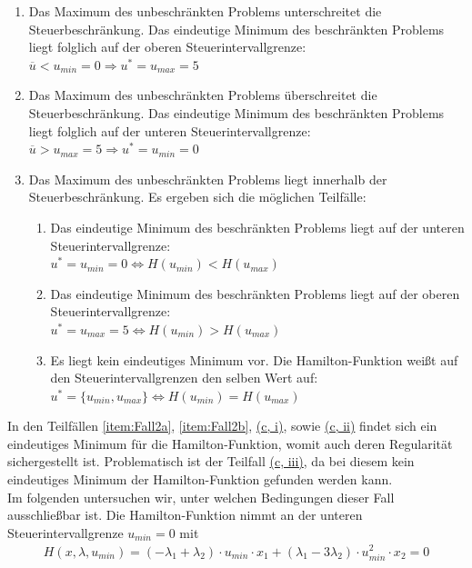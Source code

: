 \begin{enumerate}[label=(\alph*)]
	\item Das Maximum des unbeschränkten Problems unterschreitet die Steuerbeschränkung. Das eindeutige Minimum des beschränkten Problems liegt folglich auf der oberen Steuerintervallgrenze: \\ 
$\overline{u} < u_{min} = 0 \Rightarrow u^* = u_{max} = 5$ \label{item:Fall2a}
	\item Das Maximum des unbeschränkten Problems überschreitet die Steuerbeschränkung. Das eindeutige Minimum des beschränkten Problems liegt folglich auf der unteren Steuerintervallgrenze: \\ 
$\overline{u} > u_{max} = 5 \Rightarrow u^* = u_{min} = 0$ \label{item:Fall2b}
	\item Das Maximum des unbeschränkten Problems liegt innerhalb der Steuerbeschränkung. Es ergeben sich die möglichen Teilfälle: \label{item:Fall2c}
	\begin{enumerate}[label=(\roman*)]
		\item Das eindeutige Minimum des beschränkten Problems liegt auf der unteren Steuerintervallgrenze: \\
$u^* = u_{min} = 0 \Leftrightarrow H(u_{min}) < H(u_{max}) $ \label{item:Fall2ci}
		\item Das eindeutige Minimum des beschränkten Problems liegt auf der oberen Steuerintervallgrenze: \\
$u^* = u_{max} = 5 \Leftrightarrow H(u_{min}) > H(u_{max}) $ \label{item:Fall2cii}
		\item Es liegt kein eindeutiges Minimum vor. Die Hamilton-Funktion weißt auf den Steuerintervallgrenzen den selben Wert auf: \\
$u^* = \{u_{min}, u_{max}\} \Leftrightarrow H(u_{min}) = H(u_{max}) $ \label{item:Fall2ciii}
	\end{enumerate}
\end{enumerate}
In den Teilfällen \ref{item:Fall2a}, \ref{item:Fall2b}, \hyperref[item:Fall2c]{(c, i)}, sowie \hyperref[item:Fall2c]{(c, ii)} findet sich ein eindeutiges Minimum für die Hamilton-Funktion, womit auch deren Regularität sichergestellt ist. Problematisch ist der Teilfall \hyperref[item:Fall2c]{(c, iii)}, da bei diesem kein eindeutiges Minimum der Hamilton-Funktion gefunden werden kann. \\
Im folgenden untersuchen wir, unter welchen Bedingungen dieser Fall ausschließbar ist. Die Hamilton-Funktion nimmt an der unteren Steuerintervallgrenze $u_{min}=0$ mit
\begin{align}
	H(x,\lambda,u_{min}) = (-\lambda_1 + \lambda_2) \cdot u_{min} \cdot x_1 + (\lambda_1 - 3\lambda_2) \cdot u_{min}^2 \cdot x_2 = 0
\end{align}
